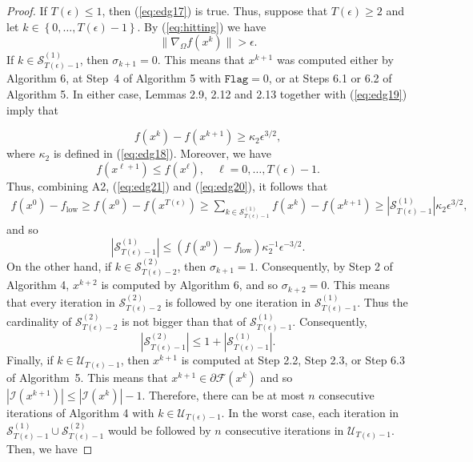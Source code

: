 \documentclass[11pt]{article}
\begin{document}
\begin{proof}
If $T(\epsilon)\leq 1$, then (\ref{eq:edg17}) is true. Thus, suppose that $T(\epsilon)\geq 2$ and let $k\in\left\{0,\dots,T(\epsilon)-1\right\}$. By (\ref{eq:hitting}) we have
\begin{equation}
\|\nabla_{\Omega}f(x^{k})\|>\epsilon.
\label{eq:edg19}
\end{equation}
If $k\in\mathcal{S}_{T(\epsilon)-1}^{(1)}$, then $\sigma_{k+1}=0$. This means that $x^{k+1}$ was computed either by Algorithm 6, at Step~4 of Algorithm 5 with $\texttt{Flag}=0$, or at Steps 6.1 or 6.2 of Algorithm 5. In either case, Lemmas 2.9, 2.12 and 2.13 together with (\ref{eq:edg19}) imply that

\begin{equation}
f(x^{k})-f(x^{k+1})\geq\kappa_{2}\epsilon^{3/2},
\label{eq:edg20}
\end{equation}
where $\kappa_{2}$ is defined in (\ref{eq:edg18}). Moreover, we have
\begin{equation}
f(x^{\ell+1})\leq f(x^{\ell}),\quad\ell=0,\dots,T(\epsilon)-1.
\label{eq:edg21}
\end{equation}
Thus, combining A2, (\ref{eq:edg21}) and (\ref{eq:edg20}), it follows that
\small
\begin{eqnarray*}
    f(x^{0})-f_{\mathrm{low}}\geq f(x^{0})-f(x^{T(\epsilon)})
    \geq  \sum_{k\in\mathcal{S}_{T(\epsilon)-1}^{(1)}}f(x^{k})-f(x^{k+1})
    \geq  \left|\mathcal{S}_{T(\epsilon)-1}^{(1)}\right|\kappa_{2}\epsilon^{3/2},
\end{eqnarray*}
\normalsize
and so
\small
\begin{equation}
\left|\mathcal{S}_{T(\epsilon)-1}^{(1)}\right|\leq\left(f(x^{0})-f_{\mathrm{low}}\right)\kappa_{2}^{-1}\epsilon^{-3/2}.
\label{eq:edg22}
\end{equation}
\normalsize
On the other hand, if $k\in\mathcal{S}_{T(\epsilon)-2}^{(2)}$, then $\sigma_{k+1}=1$. Consequently, by Step 2 of Algorithm 4, $x^{k+2}$ is computed by Algorithm 6, and so $\sigma_{k+2}=0$. This means that every iteration in $\mathcal{S}_{T(\epsilon)-2}^{(2)}$ is followed by one iteration in $\mathcal{S}_{T(\epsilon)-1}^{(1)}$. Thus the cardinality of $\mathcal{S}_{T(\epsilon)-2}^{(2)}$ is not bigger than that of $\mathcal{S}_{T(\epsilon)-1}^{(1)}$. Consequently,
\small
\begin{equation}
\left|\mathcal{S}_{T(\epsilon)-1}^{(2)}\right|\leq 1+\left|\mathcal{S}_{T(\epsilon)-1}^{(1)}\right|.
\label{eq:edg23}
\end{equation}
\normalsize
Finally, if $k\in\mathcal{U}_{T(\epsilon)-1}$, then $x^{k+1}$ is computed at Step 2.2, Step 2.3, or Step 6.3 of Algorithm~5. This means that $x^{k+1}\in\partial\mathcal{F}(x^{k})$ and so $\left|\mathcal{I}(x^{k+1})\right|\leq\left|\mathcal{I}(x^{k})\right|-1$. Therefore, there can be at most $n$ consecutive iterations of Algorithm 4 with $k\in\mathcal{U}_{T(\epsilon)-1}$. In the worst case, each iteration in $\mathcal{S}_{T(\epsilon)-1}^{(1)}\cup\mathcal{S}_{T(\epsilon)-1}^{(2)}$ would be followed by $n$ consecutive iterations in $\mathcal{U}_{T(\epsilon)-1}$. Then, we have

\end{proof}
\end{document}
